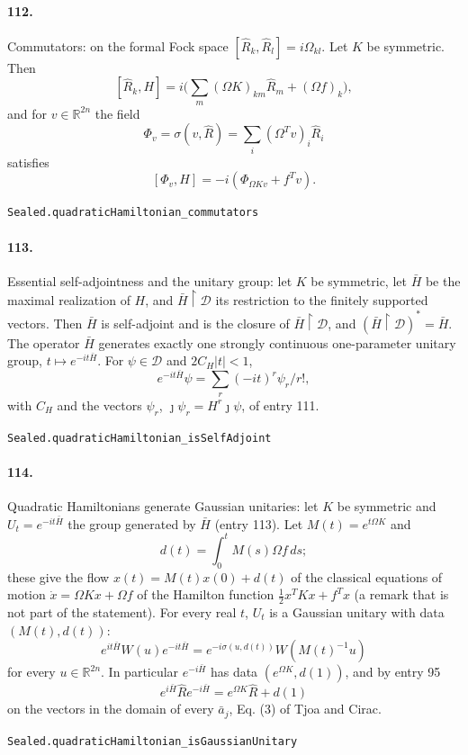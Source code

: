 \documentclass[11pt]{article}
\begin{document}
\paragraph{112.} Commutators: on the formal Fock space $[\hat R_k, \hat R_l] = i\Omega_{kl}$. Let $K$ be symmetric. Then \[[\hat R_k, H] = i\big(\sum_m (\Omega K)_{km} \hat R_m + (\Omega f)_k\big),\] and for $v \in \mathbb R^{2n}$ the field \[\Phi_v = \sigma(v, \hat R) = \sum_i (\Omega^T v)_i \hat R_i\] satisfies \[[\Phi_v, H] = -i(\Phi_{\Omega K v} + f^T v).\]\par{\footnotesize\texttt{Sealed.quadraticHamiltonian\_commutators}}

\paragraph{113.} Essential self-adjointness and the unitary group: let $K$ be symmetric, let $\bar H$ be the maximal realization of $H$, and $\bar H \restriction \mathcal D$ its restriction to the finitely supported vectors. Then $\bar H$ is self-adjoint and is the closure of $\bar H \restriction \mathcal D$, and $(\bar H \restriction \mathcal D)^* = \bar H$. The operator $\bar H$ generates exactly one strongly continuous one-parameter unitary group, $t \mapsto e^{-it\bar H}$. For $\psi \in \mathcal D$ and $2C_H|t| < 1$, \[e^{-it\bar H}\psi = \sum_r (-it)^r \psi_r/r!,\] with $C_H$ and the vectors $\psi_r$, $\jmath\psi_r = H^r\jmath\psi$, of entry 111.\par{\footnotesize\texttt{Sealed.quadraticHamiltonian\_isSelfAdjoint}}

\paragraph{114.} Quadratic Hamiltonians generate Gaussian unitaries: let $K$ be symmetric and $U_t = e^{-it\bar H}$ the group generated by $\bar H$ (entry 113). Let $M(t) = e^{t\Omega K}$ and \[d(t) = \int_0^t M(s)\Omega f\, ds;\] these give the flow $x(t) = M(t)x(0) + d(t)$ of the classical equations of motion $\dot x = \Omega K x + \Omega f$ of the Hamilton function $\frac12 x^T K x + f^T x$ (a remark that is not part of the statement). For every real $t$, $U_t$ is a Gaussian unitary with data $(M(t), d(t))$: \[e^{it\bar H} W(u) e^{-it\bar H} = e^{-i\sigma(u, d(t))} W(M(t)^{-1}u)\] for every $u \in \mathbb R^{2n}$. In particular $e^{-i\bar H}$ has data $(e^{\Omega K}, d(1))$, and by entry 95 \[e^{i\bar H} \hat R e^{-i\bar H} = e^{\Omega K} \hat R + d(1)\] on the vectors in the domain of every $\bar a_j$, Eq. (3) of Tjoa and Cirac.\par{\footnotesize\texttt{Sealed.quadraticHamiltonian\_isGaussianUnitary}}
\end{document}
